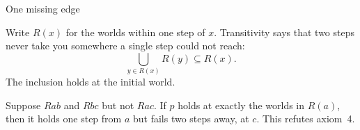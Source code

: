 \documentclass[12pt]{article}
\begin{document}
{\LARGE One missing edge\par}
\medskip
Write $R(x)$ for the worlds within one step of $x$.
Transitivity says that two steps never take you
somewhere a single step could not reach:
\[
  \bigcup_{y\in R(x)} R(y) \subseteq R(x).
\]
The inclusion holds at the initial world.

Suppose $Rab$ and $Rbc$ but not $Rac$.
If $p$ holds at exactly the worlds in $R(a)$,
then it holds one step from $a$ but fails
two steps away, at $c$. This refutes axiom~4.
\end{document}
